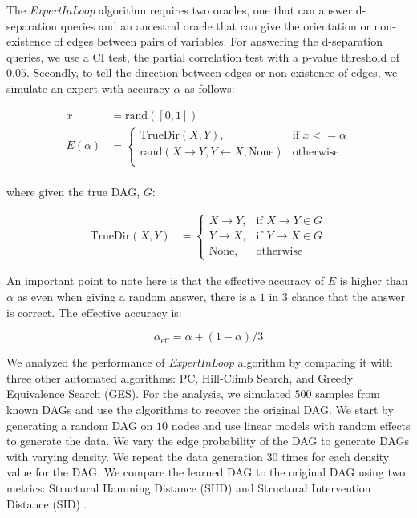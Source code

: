 \documentclass{uai2025} %
\begin{document}
The \emph{ExpertInLoop} algorithm requires two oracles, one that can answer
d-separation queries and an ancestral oracle that can give the orientation or
non-existence of edges between pairs of variables. For answering the
d-separation queries, we use a CI test, the partial correlation test with a
p-value threshold of $ 0.05 $. Secondly, to tell the direction between edges or
non-existence of edges, we simulate an expert with accuracy $ \alpha $ as
follows:

\begin{equation}
	\begin{split}
		x &= \textrm{rand}([0, 1]) \\
		E(\alpha) &= \begin{cases} 
			\mathrm{TrueDir}(X, Y),  & \textrm{if  } x <= \alpha \\
			\textrm{rand}(X \rightarrow Y, Y \leftarrow X, \textrm{None}) & \textrm{otherwise} \\
				\end{cases} \\
	\end{split}
\end{equation}

where given the true DAG, $ G $:

\begin{equation}
	\begin{split}
	\mathrm{TrueDir}(X, Y) &= \begin{cases}
					X \rightarrow Y, & \textrm{if } X \rightarrow Y \in G \\
					Y \rightarrow X, & \textrm{if } Y \rightarrow X \in G \\
					\textrm{None}, & \textrm{otherwise }
				  \end{cases}
	\end{split}
\end{equation}

An important point to note here is that the effective accuracy of $ E $ is
higher than $ \alpha $ as even when giving a random answer, there is a $ 1 $ in
$ 3 $ chance that the answer is correct. The effective accuracy is:

\begin{equation}
	\alpha_{\mathrm{eff}} = \alpha + (1 - \alpha) / 3
\end{equation}


We analyzed the performance of \emph{ExpertInLoop} algorithm by comparing it
with three other automated algorithms: PC, Hill-Climb Search, and Greedy
Equivalence Search (GES). For the analysis, we simulated $ 500 $ samples from
known DAGs and use the algorithms to recover the original DAG. We start by
generating a random DAG on $10$ nodes and use linear models with random effects
to generate the data. We vary the edge probability of the DAG to generate DAGs
with varying density. We repeat the data generation $30$ times for each density
value for the DAG. We compare the learned DAG to the original DAG using two
metrics: Structural Hamming Distance (SHD) and Structural Intervention Distance
(SID) \citep{Peters2015}.
\end{document}
